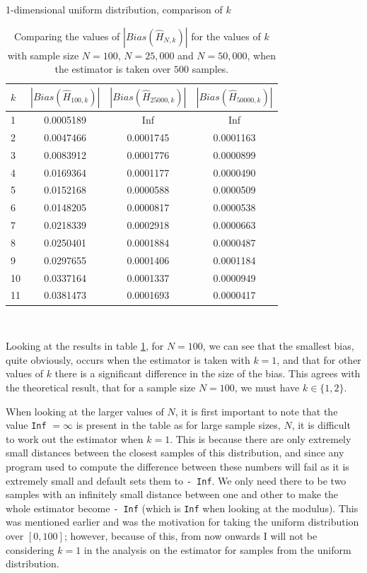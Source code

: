 \documentclass[12pt]{report}
\begin{document}
\begin{table}
\caption{1-dimensional uniform distribution, comparison of $k$} \label{uniform_kcompare_table}
\begin{center}
\begin{tabular}{| l | c c c |} 
\toprule
$k$ &  $|Bias(\hat{H}_{100, k})|$ & $|Bias(\hat{H}_{25000, k})|$  &  $|Bias(\hat{H}_{50000, k})|$ \\
\midrule[1pt]
1     & 0.0005189    &       Inf    &       Inf   \\
2     & 0.0047466    & 0.0001745    & 0.0001163   \\
3     & 0.0083912    & 0.0001776    & 0.0000899   \\
4     & 0.0169364    & 0.0001177    & 0.0000490   \\
5     & 0.0152168    & 0.0000588    & 0.0000509   \\
6     & 0.0148205    & 0.0000817    & 0.0000538   \\
7     & 0.0218339    & 0.0002918    & 0.0000663   \\
8     & 0.0250401    & 0.0001884    & 0.0000487   \\
9     & 0.0297655    & 0.0001406    & 0.0001184   \\
10    & 0.0337164    & 0.0001337    & 0.0000949   \\
11    & 0.0381473    & 0.0001693    & 0.0000417   \\
\hline
\end{tabular}
\\[10pt]
\caption*{Comparing the values of $|Bias(\hat{H}_{N, k})|$ for the values of $k$ with sample size $N=100$, $N=25,000$ and $N=50,000$, when the estimator is taken over $500$ samples.}
\end{center}
\end{table}

Looking at the results in table \ref{uniform_kcompare_table}, for $N=100$, we can see that the smallest bias, quite obviously, occurs when the estimator is taken with $k=1$, and that for other values of $k$ there is a significant difference in the size of the bias. This agrees with the theoretical result, that for a sample size $N=100$, we must have $k \in \{1, 2\}$.

When looking at the larger values of $N$, it is first important to note that the value \texttt{Inf} $= \infty$ is present in the table as for large sample sizes, $N$, it is difficult to work out the estimator when $k=1$. This is because there are only extremely small distances between the closest samples of this distribution, and since any program used to compute the difference between these numbers will fail as it is extremely small and default sets them to \texttt{- Inf}. We only need there to be two samples with an infinitely small distance between one and other to make the whole estimator become \texttt{- Inf} (which is \texttt{Inf} when looking at the modulus). This was mentioned earlier and was the motivation for taking the uniform distribution over $[0, 100]$; however, because of this, from now onwards I will not be considering $k=1$ in the analysis on the estimator for samples from the uniform distribution.
\end{document}
